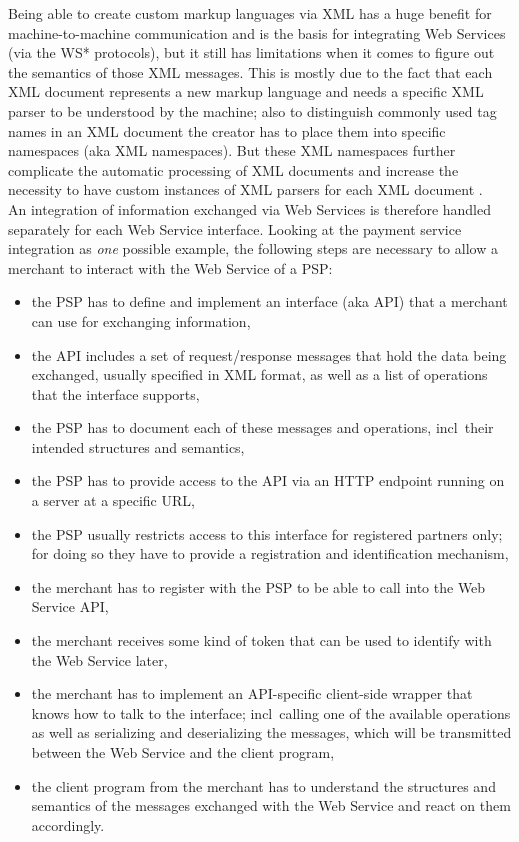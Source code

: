 Being able to create custom markup languages via \gls{XML} has a huge benefit for machine-to-machine communication and is the basis for integrating Web Services (via the WS* protocols), but it still has limitations when it comes to figure out the semantics of those \gls{XML} messages. This is mostly due to the fact that each \gls{XML} document represents a new markup language and needs a specific \gls{XML} parser to be understood by the machine; also to distinguish commonly used tag names in an \gls{XML} document the creator has to place them into specific namespaces (aka \gls{XML} namespaces). But these \gls{XML} namespaces further complicate the automatic processing of \gls{XML} documents and increase the necessity to have custom instances of \gls{XML} parsers for each \gls{XML} document \citep{taylor2008p2p}. \\

An integration of information exchanged via Web Services is therefore handled separately for each Web Service interface. Looking at the payment service integration as \emph{one} possible example, the following steps are necessary to allow a merchant to interact with the Web Service of a \gls{PSP}: \@

\begin{itemize}
  \item the \gls{PSP} has to define and implement an interface (aka \gls{API}) that a merchant can use for exchanging information,
  \item the \gls{API} includes a set of request/response messages that hold the data being exchanged, usually specified in \gls{XML} format, as well as a list of operations that the interface supports,
  \item the \gls{PSP} has to document each of these messages and operations, \gls{incl}\ their intended structures and semantics,
  \item the \gls{PSP} has to provide access to the \gls{API} via an \gls{HTTP} endpoint running on a server at a specific \gls{URL},
  \item the \gls{PSP} usually restricts access to this interface for registered partners only; for doing so they have to provide a registration and identification mechanism,
  \item the merchant has to register with the \gls{PSP} to be able to call into the Web Service \gls{API},
  \item the merchant receives some kind of token that can be used to identify with the Web Service later,
  \item the merchant has to implement an \gls{API}-specific client-side wrapper that knows how to talk to the interface; \gls{incl}\ calling one of the available operations as well as serializing and deserializing the messages, which will be transmitted between the Web Service and the client program,
  \item the client program from the merchant has to understand the structures and semantics of the messages exchanged with the Web Service and react on them accordingly.
\end{itemize}

